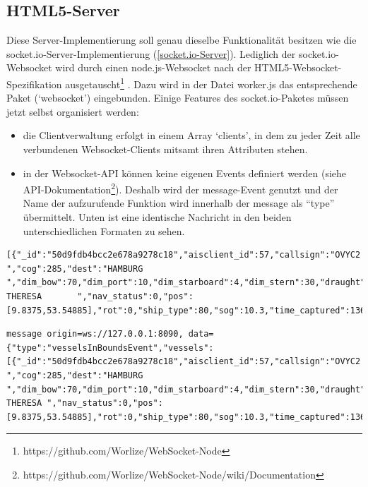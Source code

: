 \subsection{HTML5-Server}\label{HTML5-Server}
Diese Server-Implementierung soll genau dieselbe Funktionalität besitzen wie die socket.io-Server-Implementierung (\ref{socket.io-Server}). Lediglich der socket.io-Websocket wird durch einen node.js-Websocket nach der HTML5-Websocket-Spezifikation ausgetauscht\footnote{https://github.com/Worlize/WebSocket-Node} . Dazu wird in der Datei worker.js das entsprechende Paket (‘websocket’) eingebunden.
Einige Features des socket.io-Paketes müssen jetzt selbst organisiert werden: 
\begin{itemize}
\item die Clientverwaltung erfolgt in einem Array ‘clients’, in dem zu jeder Zeit alle verbundenen Websocket-Clients mitsamt ihren Attributen stehen. 
\item in der Websocket-API können keine eigenen Events definiert werden (siehe API-Dokumentation\footnote{https://github.com/Worlize/WebSocket-Node/wiki/Documentation}). Deshalb wird der message-Event genutzt und der Name der aufzurufende Funktion wird innerhalb der message als “type” übermittelt. Unten ist eine identische Nachricht in den beiden unterschiedlichen Formaten zu sehen.
\end{itemize}

\begin{lstlisting}[caption= vom socket.io-Server gesendete Nachricht, label=socket.io-message]
[{"_id":"50d9fdb4bcc2e678a9278c18","aisclient_id":57,"callsign":"OVYC2  ","cog":285,"dest":"HAMBURG             ","dim_bow":70,"dim_port":10,"dim_starboard":4,"dim_stern":30,"draught":54,"imo":"9363170","mmsi":220515000,"msgid":1,"name":"RIKKE THERESA       ","nav_status":0,"pos":[9.8375,53.54885],"rot":0,"ship_type":80,"sog":10.3,"time_captured":1366734056000,"time_received":1366733855248,"true_heading":286}]
\end{lstlisting}

\begin{lstlisting}[caption= vom HTML5-Websocket-Server gesendete Nachricht, label=websocket-message]
message origin=ws://127.0.0.1:8090, data={"type":"vesselsInBoundsEvent","vessels":[{"_id":"50d9fdb4bcc2e678a9278c18","aisclient_id":57,"callsign":"OVYC2 ","cog":285,"dest":"HAMBURG ","dim_bow":70,"dim_port":10,"dim_starboard":4,"dim_stern":30,"draught":54,"imo":"9363170","mmsi":220515000,"msgid":1,"name":"RIKKE THERESA ","nav_status":0,"pos":[9.8375,53.54885],"rot":0,"ship_type":80,"sog":10.3,"time_captured":1366733896000,"time_received":1366733855248,"true_heading":286}]}

\end{lstlisting}

